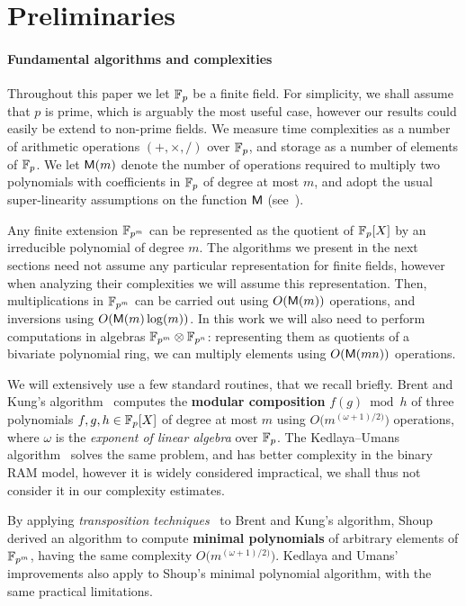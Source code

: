 \documentclass[sigconf]{acmart}
\begin{document}
\section{Preliminaries}
\label{sec:conway}

\paragraph{Fundamental algorithms and complexities}
Throughout this paper we let $\mathbb{F}_p$ be a finite field. For simplicity,
we shall assume that $p$ is prime, which is arguably the most useful
case, however our results could easily be extend to non-prime
fields. We measure time complexities as a number of arithmetic
operations $(+,\times,/)$ over $\mathbb{F}_p$, and storage as a number of
elements of $\mathbb{F}_p$. %
We let $\mathsf{M}(m)$ denote the number of operations required to multiply
two polynomials with coefficients in $\mathbb{F}_p$ of degree at most $m$, and
adopt the usual super-linearity assumptions on the function $\mathsf{M}$
(see~\cite[Ch.~8.3]{vzGG}).

Any finite extension $\mathbb{F}_{p^m}$ can be represented as the quotient of
$\mathbb{F}_p[X]$ by an irreducible polynomial of degree $m$. %
The algorithms we present in the next sections need not assume any
particular representation for finite fields, however when analyzing
their complexities we will assume this representation. %
Then, multiplications in $\mathbb{F}_{p^m}$ can be carried out using
$O(\mathsf{M}(m))$ operations, and inversions using $O(\mathsf{M}(m)\log(m))$. %
In this work we will also need to perform computations in algebras
$\mathbb{F}_{p^m}\otimes\mathbb{F}_{p^n}$: representing them as quotients of a
bivariate polynomial ring, we can multiply elements using $O(\mathsf{M}(mn))$
operations.

We will extensively use a few standard routines, that we recall
briefly. %
Brent and Kung's algorithm~\cite{brent+kung} computes the
\textbf{modular composition} $f(g)\bmod h$ of three polynomials
$f,g,h\in\mathbb{F}_p[X]$ of degree at most $m$ using
$O\bigl(m^{(\omega+1)/2)}\bigr)$ operations, where $\omega$ is the
\emph{exponent of linear algebra} over $\mathbb{F}_p$. %
The Kedlaya--Umans algorithm~\cite{KeUm11} solves the same problem,
and has better complexity in the binary RAM model, however it is
widely considered impractical, we shall thus not consider it in our
complexity estimates.

By applying \emph{transposition
  techniques}~\cite{burgisser+clausen-shokrollahi,bostan+lecerf+schost:tellegen}
to Brent and Kung's algorithm, Shoup~\cite{shoup94,shoup99} derived an
algorithm to compute \textbf{minimal polynomials} of arbitrary
elements of $\mathbb{F}_{p^m}$, having the same complexity
$O\bigl(m^{(\omega+1)/2)}\bigr)$. %
Kedlaya and Umans' improvements also apply to Shoup's minimal
polynomial algorithm, with the same practical limitations.
\end{document}

